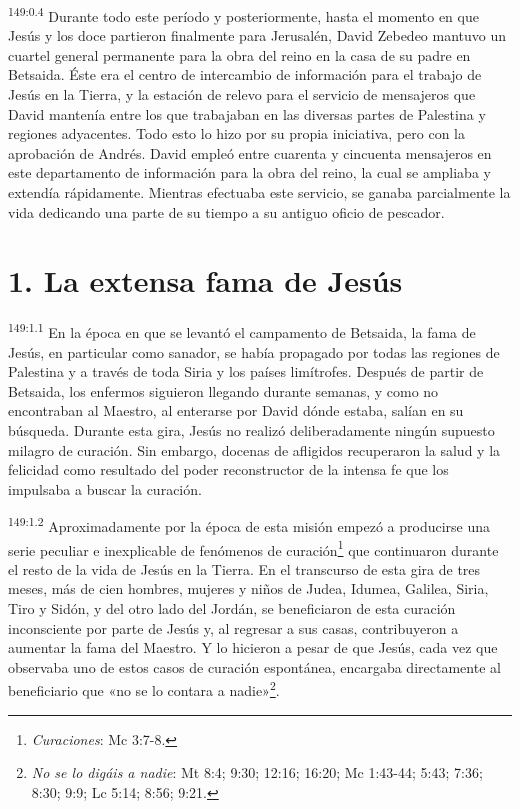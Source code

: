 \par
\textsuperscript{149:0.4} Durante todo este período y posteriormente, hasta el momento en que Jesús y los doce partieron finalmente para Jerusalén, David Zebedeo mantuvo un cuartel general permanente para la obra del reino en la casa de su padre en Betsaida. Éste era el centro de intercambio de información para el trabajo de Jesús en la Tierra, y la estación de relevo para el servicio de mensajeros que David mantenía entre los que trabajaban en las diversas partes de Palestina y regiones adyacentes. Todo esto lo hizo por su propia iniciativa, pero con la aprobación de Andrés. David empleó entre cuarenta y cincuenta mensajeros en este departamento de información para la obra del reino, la cual se ampliaba y extendía rápidamente. Mientras efectuaba este servicio, se ganaba parcialmente la vida dedicando una parte de su tiempo a su antiguo oficio de pescador.

\section*{1. La extensa fama de Jesús}
\par
\textsuperscript{149:1.1} En la época en que se levantó el campamento de Betsaida, la fama de Jesús, en particular como sanador, se había propagado por todas las regiones de Palestina y a través de toda Siria y los países limítrofes. Después de partir de Betsaida, los enfermos siguieron llegando durante semanas, y como no encontraban al Maestro, al enterarse por David dónde estaba, salían en su búsqueda. Durante esta gira, Jesús no realizó deliberadamente ningún supuesto milagro de curación. Sin embargo, docenas de afligidos recuperaron la salud y la felicidad como resultado del poder reconstructor de la intensa fe que los impulsaba a buscar la curación.

\par
\textsuperscript{149:1.2} Aproximadamente por la época de esta misión empezó a producirse una serie peculiar e inexplicable de fenómenos de curación\footnote{\textit{Curaciones}: Mc 3:7-8.} que continuaron durante el resto de la vida de Jesús en la Tierra. En el transcurso de esta gira de tres meses, más de cien hombres, mujeres y niños de Judea, Idumea, Galilea, Siria, Tiro y Sidón, y del otro lado del Jordán, se beneficiaron de esta curación inconsciente por parte de Jesús y, al regresar a sus casas, contribuyeron a aumentar la fama del Maestro. Y lo hicieron a pesar de que Jesús, cada vez que observaba uno de estos casos de curación espontánea, encargaba directamente al beneficiario que «no se lo contara a nadie»\footnote{\textit{No se lo digáis a nadie}: Mt 8:4; 9:30; 12:16; 16:20; Mc 1:43-44; 5:43; 7:36; 8:30; 9:9; Lc 5:14; 8:56; 9:21.}.

